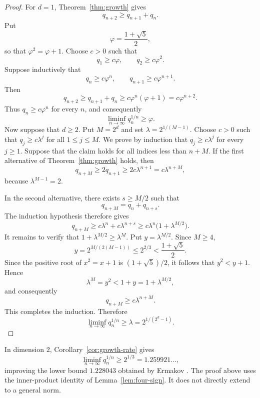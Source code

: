 \documentclass[11pt,reqno]{amsart}
\theoremstyle{definition}
\newcommand{\0}{\mbf 0}%
\begin{document}
\begin{proof}
For $d=1$, Theorem~\ref{thm:growth} gives
$$
q_{n+2}\ge q_{n+1}+q_n.
$$
Put
$$
\varphi=\frac{1+\sqrt5}{2},
$$
so that $\varphi^2=\varphi+1$. Choose $c>0$ such that
$$
q_1\ge c\varphi,\qquad q_2\ge c\varphi^2.
$$
Suppose inductively that
$$
q_n\ge c\varphi^n,\qquad q_{n+1}\ge c\varphi^{n+1}.
$$
Then
$$
q_{n+2}\ge q_{n+1}+q_n\ge c\varphi^n(\varphi+1)=c\varphi^{n+2}.
$$
Thus $q_n\ge c\varphi^n$ for every $n$, and consequently
$$
\liminf_{n\to\infty}q_n^{1/n}\ge\varphi.
$$
Now suppose that $d\ge2$. Put $M=2^d$ and set $\lambda=2^{1/(M-1)}.$
Choose $c>0$ such that $q_j\ge c\lambda^j$ for all $1\le j\le M.$
We prove by induction that $q_j\ge c\lambda^j$
for every $j\ge1$. Suppose that the claim holds for all indices less than
$n+M$. If the first alternative of Theorem~\ref{thm:growth} holds, then
$$
q_{n+M} \ge 2q_{n+1}\ge 2c\lambda^{n+1}=c\lambda^{n+M},
$$
because $\lambda^{M-1}=2$.

In the second alternative, there exists $s\ge M/2$ such that
$$
 q_{n+M}=q_n+q_{n+s}.
$$
The induction hypothesis therefore gives
$$
 q_{n+M} \ge c\lambda^n+c\lambda^{n+s} \ge c\lambda^n\bigl(1+\lambda^{M/2}\bigr).
$$
It remains to verify that $1+\lambda^{M/2}\ge\lambda^M.$
Put $y=\lambda^{M/2}$. Since $M\ge4$,
$$
 y=2^{M/(2(M-1))}
 \le 2^{2/3}
 <\frac{1+\sqrt5}{2}.
$$
Since the positive root of $x^2=x+1$ is $(1+\sqrt5)/2$, it follows that $y^2<y+1.$
Hence
$$
 \lambda^M=y^2<1+y=1+\lambda^{M/2},
$$
and consequently
$$
 q_{n+M}\ge c\lambda^{n+M}.
$$
This completes the induction. Therefore
$$
 \liminf_{n\to\infty}q_n^{1/n}
 \ge\lambda
 =2^{1/(2^d-1)}.
$$


%
\end{proof}

In dimension $2$, Corollary~\ref{cor:growth-rate} gives
$$
 \liminf_{n\to\infty}q_n^{1/n}\ge2^{1/3}=1.259921\ldots,
$$
improving the lower bound $1.228043$ obtained by Ermakov
\cite{Ermakov2010}. The proof above uses the inner-product identity
of Lemma~\ref{lem:four-sign}. It does not directly extend to a general norm.
\end{document}
